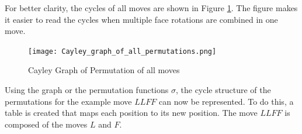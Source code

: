 \documentclass[12pt,a4paper]{article}
\theoremstyle{custom}
\begin{document}
For better clarity, the cycles of all moves are shown in Figure \ref{Figure_GraphAllerPermutations}. The figure makes it easier to read the cycles when multiple face rotations are combined in one move.

\begin{figure}[H]
\centering
\texttt{[image: Cayley\_graph\_of\_all\_permutations.png]}
\caption[Graph of all move permutations]{Cayley Graph of Permutation of all moves}
\label{Figure_GraphAllerPermutations}
\end{figure}

Using the graph or the permutation functions $\sigma$, the cycle structure of the permutations for the example move $LLFF$ can now be represented.
To do this, a table is created that maps each position to its new position. The move $LLFF$ is composed of the moves $L$ and $F$.
\end{document}
